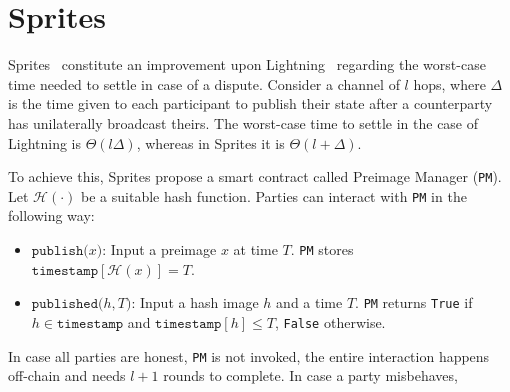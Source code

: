 \section{Sprites}
  Sprites~\cite{sprites} constitute an improvement upon Lightning~\cite{lightning}
  regarding the worst-case time needed to settle in case of a dispute. Consider a channel
  of $l$ hops, where $\Delta$ is the time given to each participant to publish their state
  after a counterparty has unilaterally broadcast theirs. The worst-case time to settle in
  the case of Lightning is $\Theta\left(l\Delta\right)$, whereas in Sprites it is
  $\Theta\left(l + \Delta\right)$.

  To achieve this, Sprites propose a smart contract called Preimage Manager (\texttt{PM}).
  Let $\mathcal{H}\left(\cdot\right)$ be a suitable hash function. Parties can interact
  with \texttt{PM} in the following way:
  \begin{itemize}
    \item $\mathtt{publish(}x\mathtt{)}$: Input a preimage $x$ at time $T$. \texttt{PM}
    stores $\mathtt{timestamp}\left[\mathcal{H}\left(x\right)\right] = T$.
    \item $\mathtt{published(}h, T\mathtt{)}$: Input a hash image $h$ and a time $T$.
    \texttt{PM} returns \texttt{True} if $h \in \mathtt{timestamp}$ and
    $\mathtt{timestamp}\left[h\right] \leq T$, \texttt{False} otherwise.
  \end{itemize}

  In case all parties are honest, \texttt{PM} is not invoked, the entire interaction
  happens off-chain and needs $l + 1$ rounds to complete. In case a party misbehaves, 
